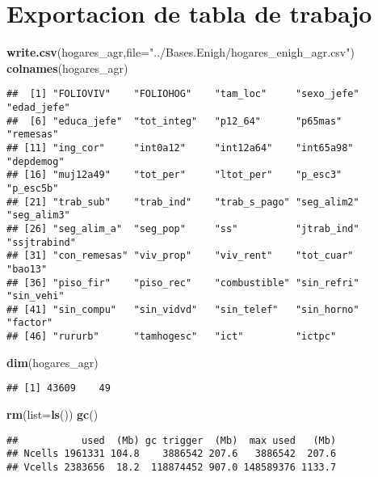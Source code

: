 \documentclass[11pt,]{article}
\newenvironment{Shaded}{\begin{snugshade}}{\end{snugshade}}
\newcommand{\KeywordTok}[1]{\textcolor[rgb]{0.13,0.29,0.53}{\textbf{#1}}}
\newcommand{\DataTypeTok}[1]{\textcolor[rgb]{0.13,0.29,0.53}{#1}}
\newcommand{\StringTok}[1]{\textcolor[rgb]{0.31,0.60,0.02}{#1}}
\newcommand{\NormalTok}[1]{#1}
\begin{document}
\section{Exportacion de tabla de
trabajo}\label{exportacion-de-tabla-de-trabajo}

\begin{Shaded}
\begin{Highlighting}[]
\KeywordTok{write.csv}\NormalTok{(hogares_agr,}\DataTypeTok{file=}\StringTok{"../Bases.Enigh/hogares_enigh_agr.csv"}\NormalTok{)}
\KeywordTok{colnames}\NormalTok{(hogares_agr)}
\end{Highlighting}
\end{Shaded}

\begin{verbatim}
##  [1] "FOLIOVIV"    "FOLIOHOG"    "tam_loc"     "sexo_jefe"   "edad_jefe"  
##  [6] "educa_jefe"  "tot_integ"   "p12_64"      "p65mas"      "remesas"    
## [11] "ing_cor"     "int0a12"     "int12a64"    "int65a98"    "depdemog"   
## [16] "muj12a49"    "tot_per"     "ltot_per"    "p_esc3"      "p_esc5b"    
## [21] "trab_sub"    "trab_ind"    "trab_s_pago" "seg_alim2"   "seg_alim3"  
## [26] "seg_alim_a"  "seg_pop"     "ss"          "jtrab_ind"   "ssjtrabind" 
## [31] "con_remesas" "viv_prop"    "viv_rent"    "tot_cuar"    "bao13"      
## [36] "piso_fir"    "piso_rec"    "combustible" "sin_refri"   "sin_vehi"   
## [41] "sin_compu"   "sin_vidvd"   "sin_telef"   "sin_horno"   "factor"     
## [46] "rururb"      "tamhogesc"   "ict"         "ictpc"
\end{verbatim}

\begin{Shaded}
\begin{Highlighting}[]
\KeywordTok{dim}\NormalTok{(hogares_agr)}
\end{Highlighting}
\end{Shaded}

\begin{verbatim}
## [1] 43609    49
\end{verbatim}

\begin{Shaded}
\begin{Highlighting}[]
\KeywordTok{rm}\NormalTok{(}\DataTypeTok{list=}\KeywordTok{ls}\NormalTok{())}
\KeywordTok{gc}\NormalTok{()}
\end{Highlighting}
\end{Shaded}

\begin{verbatim}
##           used  (Mb) gc trigger  (Mb)  max used   (Mb)
## Ncells 1961331 104.8    3886542 207.6   3886542  207.6
## Vcells 2383656  18.2  118874452 907.0 148589376 1133.7
\end{verbatim}




\newpage
\singlespacing 
\end{document}

